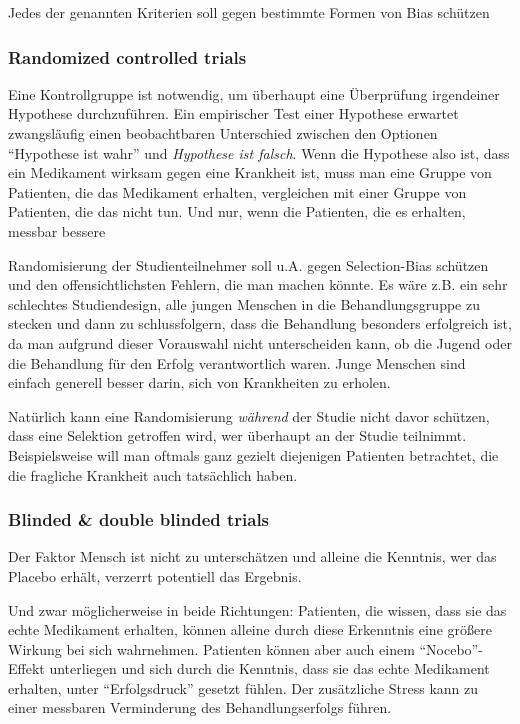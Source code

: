 Jedes der genannten Kriterien soll gegen bestimmte Formen von Bias schützen

\subsubsection{Randomized controlled trials}

Eine Kontrollgruppe ist notwendig, um überhaupt eine Überprüfung irgendeiner Hypothese durchzuführen. Ein empirischer Test einer Hypothese erwartet zwangsläufig einen beobachtbaren Unterschied zwischen den Optionen \enquote{Hypothese ist wahr} und \emph{Hypothese ist falsch}. Wenn die Hypothese also ist, dass ein Medikament wirksam gegen eine Krankheit ist, muss man eine Gruppe von Patienten, die das Medikament erhalten, vergleichen mit einer Gruppe von Patienten, die das nicht tun. Und nur, wenn die Patienten, die es erhalten, messbar bessere 

\medskip
Randomisierung der Studienteilnehmer soll u.A. gegen Selection-Bias schützen und den offensichtlichsten Fehlern, die man machen könnte. Es wäre z.B. ein sehr schlechtes Studiendesign, alle jungen Menschen in die Behandlungsgruppe zu stecken und dann zu schlussfolgern, dass die Behandlung besonders erfolgreich ist, da man aufgrund dieser Vorauswahl nicht unterscheiden kann, ob die Jugend oder die Behandlung für den Erfolg verantwortlich waren. Junge Menschen sind einfach generell besser darin, sich von Krankheiten zu erholen.

Natürlich kann eine Randomisierung \emph{während} der Studie nicht davor schützen, dass eine Selektion getroffen wird, wer überhaupt an der Studie teilnimmt. Beispielsweise will man oftmals ganz gezielt diejenigen Patienten betrachtet, die die fragliche Krankheit auch tatsächlich haben.

\subsubsection{Blinded \& double blinded trials}

Der Faktor Mensch ist nicht zu unterschätzen und alleine die Kenntnis, wer das Placebo erhält, verzerrt potentiell das Ergebnis.

\medskip
Und zwar möglicherweise in beide Richtungen: Patienten, die wissen, dass sie das echte Medikament erhalten, können alleine durch diese Erkenntnis eine größere Wirkung bei sich wahrnehmen. Patienten können aber auch einem \enquote{Nocebo}-Effekt unterliegen und sich durch die Kenntnis, dass sie das echte Medikament erhalten, unter \enquote{Erfolgsdruck} gesetzt fühlen. Der zusätzliche Stress kann zu einer messbaren Verminderung des Behandlungserfolgs führen.

